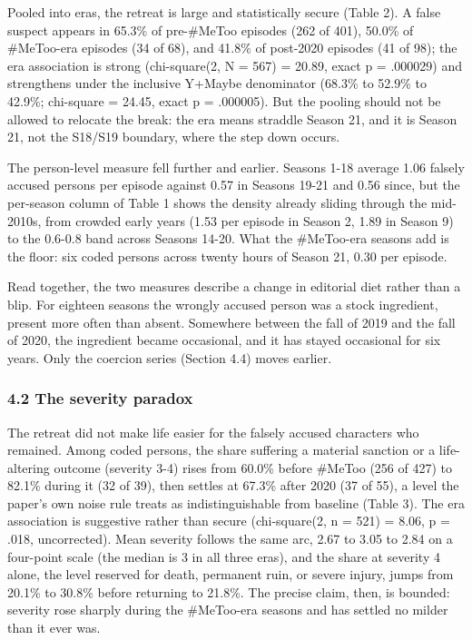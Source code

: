 \documentclass[
]{article}
\begin{document}
Pooled into eras, the retreat is large and statistically secure (Table
2). A false suspect appears in 65.3\% of pre-\#MeToo episodes (262 of
401), 50.0\% of \#MeToo-era episodes (34 of 68), and 41.8\% of post-2020
episodes (41 of 98); the era association is strong (chi-square(2, N =
567) = 20.89, exact p = .000029) and strengthens under the inclusive
Y+Maybe denominator (68.3\% to 52.9\% to 42.9\%; chi-square = 24.45,
exact p = .000005). But the pooling should not be allowed to relocate
the break: the era means straddle Season 21, and it is Season 21, not
the S18/S19 boundary, where the step down occurs.

The person-level measure fell further and earlier. Seasons 1-18 average
1.06 falsely accused persons per episode against 0.57 in Seasons 19-21
and 0.56 since, but the per-season column of Table 1 shows the density
already sliding through the mid-2010s, from crowded early years (1.53
per episode in Season 2, 1.89 in Season 9) to the 0.6-0.8 band across
Seasons 14-20. What the \#MeToo-era seasons add is the floor: six coded
persons across twenty hours of Season 21, 0.30 per episode.

Read together, the two measures describe a change in editorial diet
rather than a blip. For eighteen seasons the wrongly accused person was
a stock ingredient, present more often than absent. Somewhere between
the fall of 2019 and the fall of 2020, the ingredient became occasional,
and it has stayed occasional for six years. Only the coercion series
(Section 4.4) moves earlier.

\subsubsection{4.2 The severity paradox}\label{the-severity-paradox}

The retreat did not make life easier for the falsely accused characters
who remained. Among coded persons, the share suffering a material
sanction or a life-altering outcome (severity 3-4) rises from 60.0\%
before \#MeToo (256 of 427) to 82.1\% during it (32 of 39), then settles
at 67.3\% after 2020 (37 of 55), a level the paper's own noise rule
treats as indistinguishable from baseline (Table 3). The era association
is suggestive rather than secure (chi-square(2, n = 521) = 8.06, p =
.018, uncorrected). Mean severity follows the same arc, 2.67 to 3.05 to
2.84 on a four-point scale (the median is 3 in all three eras), and the
share at severity 4 alone, the level reserved for death, permanent ruin,
or severe injury, jumps from 20.1\% to 30.8\% before returning to
21.8\%. The precise claim, then, is bounded: severity rose sharply
during the \#MeToo-era seasons and has settled no milder than it ever
was.
\end{document}
